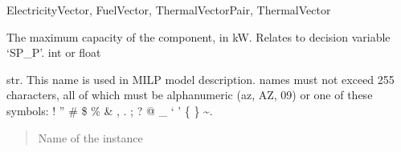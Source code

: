 \documentclass[letterpaper,10pt,english]{sphinxmanual}
\begin{document}
\begin{fulllineitems}
\begin{fulllineitems}
\label{\detokenize{generated/tamos.production.ElementConverter:tamos.production.ElementConverter.element_2}}
\pysigstartsignatures
{}
\pysigstopsignatures
\sphinxAtStartPar
ElectricityVector, FuelVector, ThermalVectorPair, ThermalVector

\end{fulllineitems}


\begin{fulllineitems}
\label{\detokenize{generated/tamos.production.ElementConverter:tamos.production.ElementConverter.given_sizing}}
\pysigstartsignatures
{}
\pysigstopsignatures
\sphinxAtStartPar
The maximum capacity of the component, in kW.
Relates to decision variable ‘SP\_P’.
int or float

\end{fulllineitems}


\begin{fulllineitems}
\label{\detokenize{generated/tamos.production.ElementConverter:tamos.production.ElementConverter.name}}
\pysigstartsignatures
{}
\pysigstopsignatures
\sphinxAtStartPar
str.
This name is used in MILP model description.
names must not exceed 255 characters,
all of which must be alphanumeric (a\sphinxhyphen{}z, A\sphinxhyphen{}Z, 0\sphinxhyphen{}9) or one of these symbols:
! ” \# \$ \% \& , . ; ? @ \_ ‘ ’ \{ \} \textasciitilde{}.
\begin{quote}\begin{description}
\sphinxAtStartPar
Name of the instance

\end{description}\end{quote}

\end{fulllineitems}



\end{fulllineitems}
\end{document}
